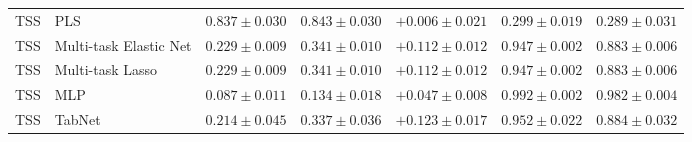 \begin{longtable}{lp{3.1cm}rrrrr}
TSS & PLS & $0.837\pm0.030$ & $0.843\pm0.030$ & $+0.006\pm0.021$ & $0.299\pm0.019$ & $0.289\pm0.031$ \\
TSS & Multi-task Elastic Net & $0.229\pm0.009$ & $0.341\pm0.010$ & $+0.112\pm0.012$ & $0.947\pm0.002$ & $0.883\pm0.006$ \\
TSS & Multi-task Lasso & $0.229\pm0.009$ & $0.341\pm0.010$ & $+0.112\pm0.012$ & $0.947\pm0.002$ & $0.883\pm0.006$ \\
TSS & MLP & $0.087\pm0.011$ & $0.134\pm0.018$ & $+0.047\pm0.008$ & $0.992\pm0.002$ & $0.982\pm0.004$ \\
TSS & TabNet & $0.214\pm0.045$ & $0.337\pm0.036$ & $+0.123\pm0.017$ & $0.952\pm0.022$ & $0.884\pm0.032$ \\
\end{longtable}

